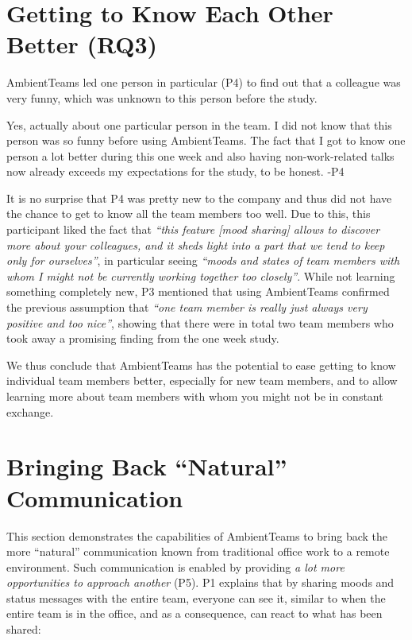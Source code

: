 \section{Getting to Know Each Other Better (RQ3)}
\label{section:getting_to_know_each_other_better}
AmbientTeams led one person in particular (P4) to find out that a colleague was very funny, which was unknown to this person before the study.

\begin{displayquote}
    Yes, actually about one particular person in the team. I did not know that this person was so funny before using AmbientTeams. The fact that I got to know one person a lot better during this one week and also having non-work-related talks now already exceeds my expectations for the study, to be honest. -P4
\end{displayquote}

It is no surprise that P4 was pretty new to the company and thus did not have the chance to get to know all the team members too well. Due to this, this participant liked the fact that \textit{\enquote{this feature [mood sharing] allows to discover more about your colleagues, and it sheds light into a part that we tend to keep only for ourselves}}, in particular seeing \textit{\enquote{moods and states of team members with whom I might not be currently working together too closely}}.  While not learning something completely new, P3 mentioned that using AmbientTeams confirmed the previous assumption that \textit{\enquote{one team member is really just always very positive and too nice}}, showing that there were in total two team members who took away a promising finding from the one week study.

We thus conclude that AmbientTeams has the potential to ease getting to know individual team members better, especially for new team members, and to allow learning more about team members with whom you might not be in constant exchange.


\section{Bringing Back \enquote{Natural} Communication}
\label{section:bringing_back_natural_communication}
This section demonstrates the capabilities of AmbientTeams to bring back the more \enquote{natural} communication known from traditional office work to a remote environment. Such communication is enabled by providing \textit{a lot more opportunities to approach another} (P5). P1 explains that by sharing moods and status messages with the entire team, everyone can see it, similar to when the entire team is in the office, and as a consequence, can react to what has been shared:

